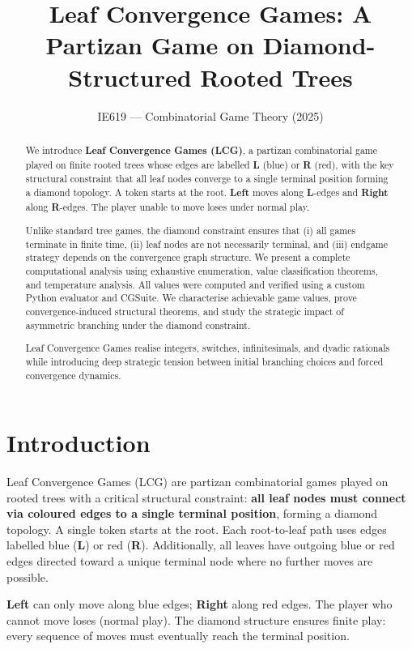 \documentclass[10pt,a4paper,twocolumn]{article}
\title{Leaf Convergence Games: A Partizan Game on Diamond-Structured Rooted Trees}
\author{IE619 --- Combinatorial Game Theory (2025)}
\date{}
\newcommand{\Lopt}[1]{{\color{lblue}\textbf{#1}}}
\newcommand{\Ropt}[1]{{\color{rred}\textbf{#1}}}
\theoremstyle{plain}
\theoremstyle{definition}
\theoremstyle{remark}
\begin{document}
\maketitle

\begin{abstract}
We introduce \textbf{Leaf Convergence Games (LCG)}, a partizan combinatorial game played on finite rooted trees whose edges are labelled \Lopt{L} (blue) or \Ropt{R} (red), with the key structural constraint that all leaf nodes converge to a single terminal position forming a diamond topology. A token starts at the root. \Lopt{Left} moves along \Lopt{L}-edges and \Ropt{Right} along \Ropt{R}-edges. The player unable to move loses under normal play. 

Unlike standard tree games, the diamond constraint ensures that (i) all games terminate in finite time, (ii) leaf nodes are not necessarily terminal, and (iii) endgame strategy depends on the convergence graph structure. We present a complete computational analysis using exhaustive enumeration, value classification theorems, and temperature analysis. All values were computed and verified using a custom Python evaluator and CGSuite. We characterise achievable game values, prove convergence-induced structural theorems, and study the strategic impact of asymmetric branching under the diamond constraint.

Leaf Convergence Games realise integers, switches, infinitesimals, and dyadic rationals while introducing deep strategic tension between initial branching choices and forced convergence dynamics.
\end{abstract}

\section{Introduction}

Leaf Convergence Games (LCG) are partizan combinatorial games played on rooted trees with a critical structural constraint: \textbf{all leaf nodes must connect via coloured edges to a single terminal position}, forming a diamond topology. A single token starts at the root. Each root-to-leaf path uses edges labelled blue (\Lopt{L}) or red (\Ropt{R}). Additionally, all leaves have outgoing blue or red edges directed toward a unique terminal node where no further moves are possible.

\Lopt{Left} can only move along blue edges; \Ropt{Right} along red edges. The player who cannot move loses (normal play). The diamond structure ensures finite play: every sequence of moves must eventually reach the terminal position.
\end{document}
